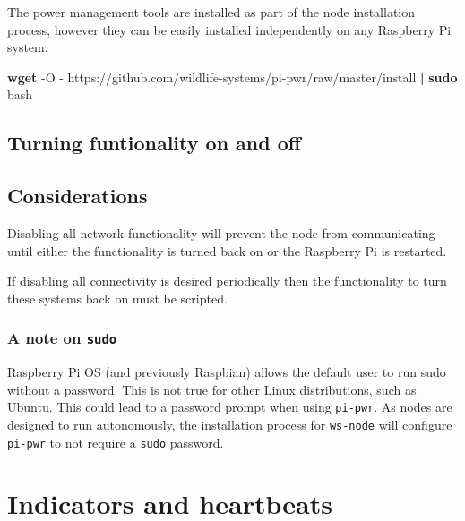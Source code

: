 \documentclass[
]{book}
\newenvironment{Shaded}{\begin{snugshade}}{\end{snugshade}}
\newcommand{\AttributeTok}[1]{\textcolor[rgb]{0.13,0.29,0.53}{#1}}
\newcommand{\FunctionTok}[1]{\textcolor[rgb]{0.13,0.29,0.53}{\textbf{#1}}}
\newcommand{\KeywordTok}[1]{\textcolor[rgb]{0.13,0.29,0.53}{\textbf{#1}}}
\newcommand{\NormalTok}[1]{#1}
\begin{document}
The power management tools are installed as part of the node installation process, however they can be easily installed independently on any Raspberry Pi system.

\begin{Shaded}
\begin{Highlighting}[]
\FunctionTok{wget} \AttributeTok{{-}O} \AttributeTok{{-}}\NormalTok{ https://github.com/wildlife{-}systems/pi{-}pwr/raw/master/install }\KeywordTok{|} \FunctionTok{sudo}\NormalTok{ bash}
\end{Highlighting}
\end{Shaded}

\hypertarget{turning-funtionality-on-and-off}{%
\section{Turning funtionality on and off}\label{turning-funtionality-on-and-off}}

\hypertarget{considerations}{%
\section{Considerations}\label{considerations}}

Disabling all network functionality will prevent the node from communicating until either the functionality is turned back on or the Raspberry Pi is restarted.

If disabling all connectivity is desired periodically then the functionality to turn these systems back on must be scripted.

\hypertarget{a-note-on-sudo}{%
\subsection{\texorpdfstring{A note on \texttt{sudo}}{A note on sudo}}\label{a-note-on-sudo}}

Raspberry Pi OS (and previously Raspbian) allows the default user to run sudo without a password. This is not true for other Linux distributions, such as Ubuntu. This could lead to a password prompt when using \texttt{pi-pwr}. As nodes are designed to run autonomously, the installation process for \texttt{ws-node} will configure \texttt{pi-pwr} to not require a \texttt{sudo} password.

\hypertarget{indicators-and-heartbeats}{%
\chapter{Indicators and heartbeats}\label{indicators-and-heartbeats}}
\end{document}
